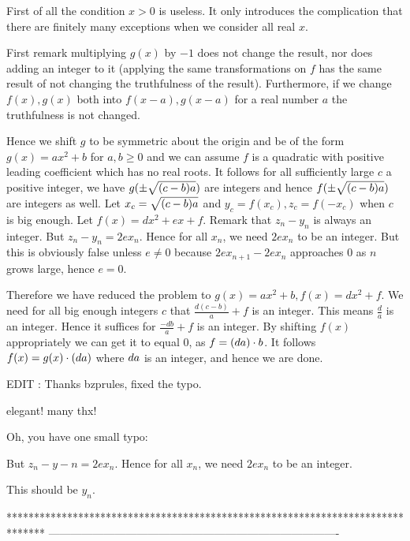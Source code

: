 \begin{solution}
	First of all the condition $x > 0$ is useless.  It only introduces the complication that there are finitely many exceptions when we consider all real $x$.

First remark multiplying $g(x)$ by $-1$ does not change the result, nor does adding an integer to it (applying the same transformations on $f$ has the same result of not changing the truthfulness of the result). Furthermore, if we change $f(x), g(x)$ both into $f(x-a), g(x-a)$ for a real number $a$ the truthfulness is not changed.

Hence we shift $g$ to be symmetric about the origin and be of the form $g(x) = ax^2 + b$ for $a,b \ge 0$ and we can assume $f$ is a quadratic with positive leading coefficient which has no real roots. It follows for all sufficiently large $c$ a positive integer, we have $g(\pm \sqrt{(c-b)\/a})$ are integers and hence $f(\pm \sqrt{(c-b)\/a})$ are integers as well. Let $x_c = \sqrt{(c-b)\/a}$ and $y_c = f(x_c), z_c = f(-x_c)$ when $c$ is big enough. Let $f(x) = dx^2 + ex + f$. Remark that $z_n - y_n$ is always an integer.
But $z_n - y_n = 2ex_n$. Hence for all $x_n$, we need $2ex_n$ to be an integer. But this is obviously false unless $e \neq 0$ because $2ex_{n+1} - 2ex_n$ approaches $0$ as $n$ grows large, hence $e=0$.

Therefore we have reduced the problem to $g(x) = ax^2 + b, f(x) = dx^2 + f$. We need for all big enough integers $c$ that $\frac{d(c-b)}{a} + f$ is an integer. This means $\frac{d}{a}$ is an integer. Hence it suffices for $\frac{-db}{a} + f$ is an integer. By shifting $f(x)$ appropriately we can get it to equal $0$, as $f = (d\/a) \cdot b$. It follows $f(x) = g(x) \cdot (d\/a)$ where $d\/a$ is an integer, and hence we are done.

EDIT : Thanks bzprules, fixed the typo.
\end{solution}



\begin{solution}
	elegant!
many thx!
\end{solution}



\begin{solution}
	Oh, you have one small typo:
\begin{tcolorbox}
But $z_n - y-n = 2ex_n$. Hence for all $x_n$, we need $2ex_n$ to be an integer.
\end{tcolorbox}
This should be $y_n$.
\end{solution}
*******************************************************************************
-------------------------------------------------------------------------------

